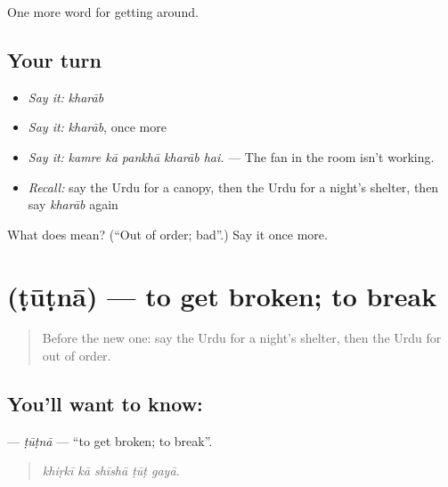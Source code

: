 \begin{grammarlens}[title={What you've built}]
One more word for getting around.
\end{grammarlens}

\subsection*{Your turn}
\begin{itemize}
\raggedright
  \item \emph{Say it:} \emph{kharāb}
  \item \emph{Say it:} \emph{kharāb}, once more
  \item \emph{Say it:} \emph{kamre kā pankhā kharāb hai.} — The fan in the room isn't working.
  \item \emph{Recall:} say the Urdu for a canopy, then the Urdu for a night's shelter, then say \emph{kharāb} again
\end{itemize}

\begin{tcolorbox}[breakable,colback=teal!4,colframe=teal!35!black,title={Before you move on}]
What does  mean? (\textquotedblleft{}Out of order; bad\textquotedblright{}.) Say it once more.
\end{tcolorbox}
\section[\texorpdfstring{\ur{ٹوٹنا} (ṭūṭnā)}{ٹوٹنا (ṭūṭnā)}]{ (ṭūṭnā) — to get broken; to break}

\label{lesson:UR-C407-tutna}



\begin{quote}
Before the new one: say the Urdu for a night's shelter, then the Urdu for out of order.
\end{quote}

\subsection*{You'll want to know: }
\textbf{} — \emph{ṭūṭnā} — \textquotedblleft{}to get broken; to break\textquotedblright{}.

\begin{quote}
    
\end{quote}

\begin{quote}
\emph{khiṛkī kā shīshā ṭūṭ gayā.}
\end{quote}

